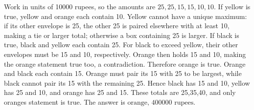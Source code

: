 Work in units of 10000 rupees, so the amounts are $25,25,15,15,10,10$. If yellow is true, yellow and orange each contain 10. Yellow cannot have a unique maximum: if its other envelope is 25, the other 25 is paired elsewhere with at least 10, making a tie or larger total; otherwise a box containing 25 is larger. If black is true, black and yellow each contain 25. For black to exceed yellow, their other envelopes must be 15 and 10, respectively. Orange then holds 15 and 10, making the orange statement true too, a contradiction. Therefore orange is true. Orange and black each contain 15. Orange must pair its 15 with 25 to be largest, while black cannot pair its 15 with the remaining 25. Hence black has 15 and 10, yellow has 25 and 10, and orange has 25 and 15. These totals are 25,35,40, and only orange\textquotesingle s statement is true. The answer is $\boxed{\text{orange, }400000\text{ rupees}}$.
